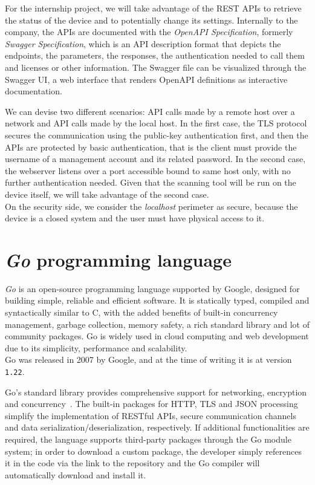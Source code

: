 For the internship project, we will take advantage of the REST APIs to retrieve the status of the device and to potentially change its settings. Internally to the company, the APIs are documented with the \textit{OpenAPI Specification}, formerly \textit{Swagger Specification}, which is an API description format that depicts the endpoints, the parameters, the responses, the authentication needed to call them and licenses or other information. The Swagger file can be visualized through the Swagger UI, a web interface that renders OpenAPI definitions as interactive documentation.~\cite{openapi-swagger}

We can devise two different scenarios: API calls made by a remote host over a network and API calls made by the local host. In the first case, the TLS protocol secures the communication using the public-key authentication first, and then the APIs are protected by basic authentication, that is the client must provide the username of a management account and its related password. In the second case, the webserver listens over a port accessible bound to same host only, with no further authentication needed. Given that the scanning tool will be run on the device itself, we will take advantage of the second case. \\
On the security side, we consider the \textit{localhost} perimeter as secure, because the device is a closed system and the user must have physical access to it.

\section{\textit{Go} programming language}
\label{sec:go-lang}

\textit{Go} is an open-source programming language supported by Google, designed for building simple, reliable and efficient software. It is statically typed, compiled and syntactically similar to C, with the added benefits of built-in concurrency management, garbage collection, memory safety, a rich standard library and lot of community packages. Go is widely used in cloud computing and web development due to its simplicity, performance and scalability.~\cite{go-lang-site}~\cite{go-lang-wikipedia}\\
Go was released in 2007 by Google, and at the time of writing it is at version \texttt{1.22}.

Go's standard library provides comprehensive support for networking, encryption and concurrency~\cite{go-package-std}. The built-in packages for HTTP, TLS and JSON processing simplify the implementation of RESTful APIs, secure communication channels and data serialization/deserialization, respectively. If additional functionalities are required, the language supports third-party packages through the Go module system; in order to download a custom package, the developer simply references it in the code via the link to the repository and the Go compiler will automatically download and install it.

